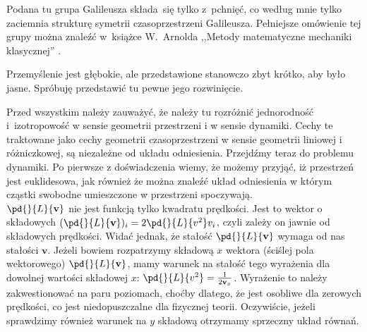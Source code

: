 \documentclass[a4paper,11pt]{article}
\begin{document}
\vspace{\spaceTwo}





\newpage
{} %

\vspace{\spaceTwo} \vspace{\spaceThree}






\start {} Podana tu grupa Galileusza składa~się tylko z~pchnięć,
co według mnie tylko zaciemnia strukturę symetrii czasoprzestrzeni
Galileusza. Pełniejsze omówienie tej grupy można znaleźć w~książce
W.~Arnolda ,,Metody matematyczne mechaniki klasycznej''
\cite{Arnold81}.

\vspace{\spaceFour}


\start {} Przemyślenie jest głębokie, ale przedstawione
stanowczo zbyt krótko, aby było jasne. Spróbuję przedstawić tu pewne
jego rozwinięcie.

Przed wszystkim należy zauważyć, że należy tu rozróżnić jednorodność
i~izotropowość w sensie geometrii przestrzeni i w sensie dynamiki.
Cechy te traktowane jako cechy geometrii czasoprzestrzeni w sensie
geometrii liniowej i różniczkowej, są niezależne od układu
odniesienia. Przejdźmy teraz do problemu dynamiki. Po pierwsze z
doświadczenia wiemy, że możemy przyjąć, iż przestrzeń jest
euklidesowa, jak również że można znaleźć układ odniesienia w którym
cząstki swobodne umieszczone w przestrzeni spoczywają. \\
\start {} $\pd{}{ L }{ \mathbf{ v } }$ nie jest funkcją tylko
kwadratu prędkości. Jest to wektor o składowych
$( \pd{}{ L }{ \mathbf{ v }} )_{ i } = 2 \pd{}{ L }{ { v^{ 2 } } } v_{
  i }$, czyli zależy on jawnie od składowych prędkości. Widać jednak,
że stałość $\pd{}{ L }{ \mathbf{ v } }$ wymaga od nas stałości
$\mathbf{ v }$. Jeżeli bowiem rozpatrzymy składową $x$ wektora
(ściślej pola wektorowego) $\pd{}{ L }{ \mathbf{ v } }$, mamy warunek
na stałość tego wyrażenia dla dowolnej wartości składowej $x$:
$\pd{}{ L }{ { v^{ 2 } } } = \frac{ 1 }{ 2 \mathbf{ v }_{ x } }$.
Wyrażenie to należy zakwestionować na paru poziomach, choćby dlatego,
że jest osobliwe dla zerowych prędkości, co jest niedopuszczalne dla
fizycznej teorii. Oczywiście, jeżeli sprawdzimy również warunek na
$ y $ składową otrzymamy sprzeczny układ równań.
\end{document}
